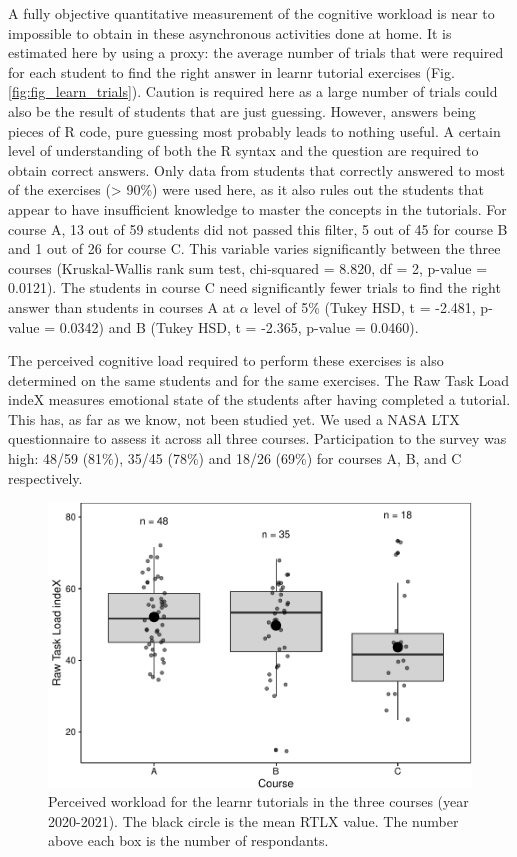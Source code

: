 \documentclass{aims}
\theoremstyle{definition}
\begin{document}
A fully objective quantitative measurement of the cognitive workload is
near to impossible to obtain in these asynchronous activities done at
home. It is estimated here by using a proxy: the average number of
trials that were required for each student to find the right answer in
learnr tutorial exercises (Fig. \ref {fig:fig_learn_trials}). Caution is
required here as a large number of trials could also be the result of
students that are just guessing. However, answers being pieces of R
code, pure guessing most probably leads to nothing useful. A certain
level of understanding of both the R syntax and the question are
required to obtain correct answers. Only data from students that
correctly answered to most of the exercises (\textgreater{} 90\%) were
used here, as it also rules out the students that appear to have
insufficient knowledge to master the concepts in the tutorials. For
course A, 13 out of 59 students did not passed this filter, 5 out of 45
for course B and 1 out of 26 for course C. This variable varies
significantly between the three courses (Kruskal-Wallis rank sum test,
chi-squared = 8.820, df = 2, p-value = 0.0121). The students in course C
need significantly fewer trials to find the right answer than students
in courses A at \(\alpha\) level of 5\% (Tukey HSD, t = -2.481, p-value
= 0.0342) and B (Tukey HSD, t = -2.365, p-value = 0.0460).

The perceived cognitive load required to perform these exercises is also
determined on the same students and for the same exercises. The Raw Task
Load indeX measures emotional state of the students after having
completed a tutorial. This has, as far as we know, not been studied yet.
We used a NASA LTX questionnaire to assess it across all three courses.
Participation to the survey was high: 48/59 (81\%), 35/45 (78\%) and
18/26 (69\%) for courses A, B, and C respectively.

\begin{figure}
\includegraphics[width=1\linewidth]{teaching_data_science_files/figure-latex/fig_rtlx-1} \caption{\label{fig:fig_rtlx} Perceived workload for the learnr tutorials in the three courses (year 2020-2021). The black circle is the mean RTLX value. The number above each box is the number of respondants.}\label{fig:fig_rtlx}
\end{figure}
\end{document}
